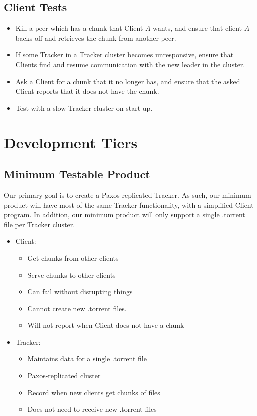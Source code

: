 \documentclass[12pt]{article}
\begin{document}
\subsection*{Client Tests}
\begin{itemize}
\item  Kill a peer which has a chunk that Client $A$ wants, and ensure that
       client $A$ backs off and retrieves the chunk from another peer.
\item  If some Tracker in a Tracker cluster becomes unresponsive, ensure that
       Clients find and resume communication with the new leader in the cluster.
\item  Ask a Client for a chunk that it no longer has, and ensure that the asked
       Client reports that it does not have the chunk.
\item  Test with a slow Tracker cluster on start-up.
\end{itemize}

\section*{Development Tiers}

\subsection*{Minimum Testable Product}
Our primary goal is to create a Paxos-replicated Tracker.
As such, our minimum product will have most of the same Tracker functionality,
with a simplified Client program.
In addition, our minimum product will only support a single .torrent file per
Tracker cluster.

\begin{itemize}
\item  Client:
    \begin{itemize}
    \item  Get chunks from other clients
    \item  Serve chunks to other clients
    \item  Can fail without disrupting things
    \item  Cannot create new .torrent files.
    \item  Will not report when Client does not have a chunk
    \end{itemize}
\item  Tracker:
    \begin{itemize}
    \item  Maintains data for a single .torrent file
    \item  Paxos-replicated cluster
    \item  Record when new clients get chunks of files
    \item  Does not need to receive new .torrent files
    \end{itemize}
\end{itemize}
\end{document}
